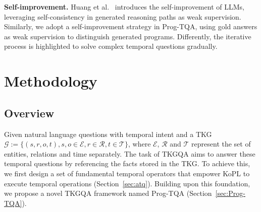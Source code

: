 \documentclass[10pt, a4paper]{article}
\begin{document}
\textbf{Self-improvement.} 
Huang et al.~\cite{huang2023large} introduces the self-improvement of LLMs, leveraging self-consistency in generated reasoning paths as weak supervision. Similarly, we adopt a self-improvement strategy in Prog-TQA, using gold answers as weak supervision to distinguish generated programs. Differently, the iterative process is highlighted to solve complex temporal questions gradually.
\section{Methodology}
\subsection{Overview}
Given natural language questions with temporal intent and a TKG $\mathcal{G}:=\{(s,r,o,t), s,o \in \mathcal{E}, r\in \mathcal{R}, t \in \mathcal{T}\}$, where $\mathcal{E}$, $\mathcal{R}$ and $\mathcal{T}$ represent the set of entities, relations and time separately. The task of TKGQA aims to answer these temporal questions by referencing the facts stored in the TKG. 
To achieve this, we first design a set of fundamental temporal operators that empower KoPL to execute temporal operations (Section~\ref{sec:atq}). Building upon this foundation, we propose a novel TKGQA framework named Prog-TQA (Section~\ref{sec:Prog-TQA}).
\end{document}
